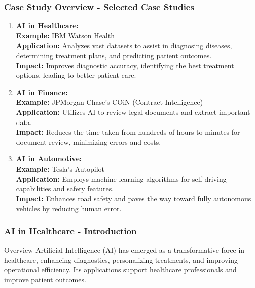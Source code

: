 \documentclass{beamer}
\begin{document}
\begin{frame}[fragile]
    \frametitle{Case Study Overview - Selected Case Studies}
    \begin{enumerate}
        \item \textbf{AI in Healthcare:} \\
        \textbf{Example:} IBM Watson Health \\
        \textbf{Application:} Analyzes vast datasets to assist in diagnosing diseases, determining treatment plans, and predicting patient outcomes. \\
        \textbf{Impact:} Improves diagnostic accuracy, identifying the best treatment options, leading to better patient care.

        \item \textbf{AI in Finance:} \\
        \textbf{Example:} JPMorgan Chase's COiN (Contract Intelligence) \\
        \textbf{Application:} Utilizes AI to review legal documents and extract important data. \\
        \textbf{Impact:} Reduces the time taken from hundreds of hours to minutes for document review, minimizing errors and costs.

        \item \textbf{AI in Automotive:} \\
        \textbf{Example:} Tesla's Autopilot \\
        \textbf{Application:} Employs machine learning algorithms for self-driving capabilities and safety features. \\
        \textbf{Impact:} Enhances road safety and paves the way toward fully autonomous vehicles by reducing human error.
    \end{enumerate}
\end{frame}

\begin{frame}[fragile]
    \frametitle{AI in Healthcare - Introduction}
    \begin{block}{Overview}
        Artificial Intelligence (AI) has emerged as a transformative force in healthcare, enhancing diagnostics, personalizing treatments, and improving operational efficiency. Its applications support healthcare professionals and improve patient outcomes.
    \end{block}
\end{frame}
\end{document}
